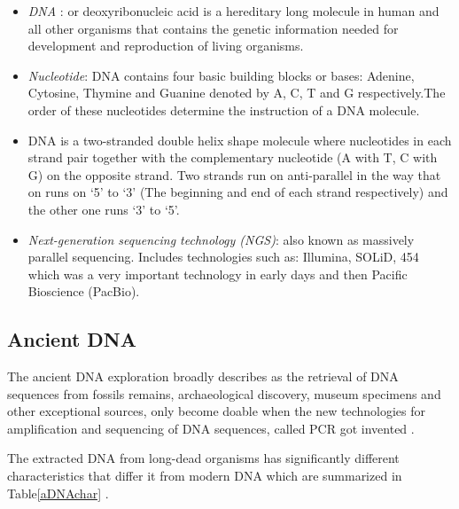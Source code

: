 \documentclass[11pt,a4paper]{report}
\begin{document}
\begin{itemize} 
	\item  \emph{DNA }: or deoxyribonucleic acid is a hereditary long molecule in human and all other organisms that contains the genetic information needed for development and reproduction of living organisms.
	
	
	\item \emph{Nucleotide}: DNA contains four basic building blocks or bases: Adenine, Cytosine, Thymine and Guanine denoted by A, C, T and G respectively.The order of these nucleotides determine the instruction of a DNA molecule.
	
	\item DNA is a two-stranded double helix shape molecule where nucleotides in each strand pair together with the complementary nucleotide (A with T, C with G) on the opposite strand. Two strands run on anti-parallel in the way that on runs on \enquote*{5} to \enquote*{3} (The beginning and end of each strand respectively) and the other one runs \enquote*{3} to \enquote*{5}.
	
	\item \emph{Next-generation sequencing technology (NGS)}: also known as massively parallel sequencing.
	Includes technologies such as: Illumina, SOLiD, 454 which was a very important technology in early days and then Pacific Bioscience (PacBio).
	
	
\end{itemize}

\subsection{Ancient DNA }
The ancient DNA exploration broadly describes as the retrieval of DNA sequences from fossils remains, archaeological discovery, museum specimens and other exceptional sources, only become doable when the new technologies for amplification and sequencing of DNA sequences, called PCR got invented \cite{paabo2004genetic}.

The extracted DNA from long-dead organisms has significantly different characteristics that differ it from modern DNA which are summarized in Table\ref{aDNAchar} .\\
\end{document}
